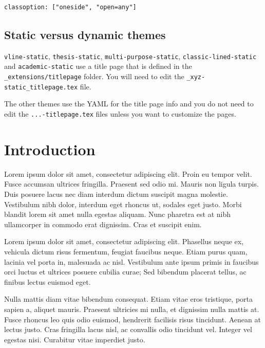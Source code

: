 \documentclass[
  oneside,
  open=any]{scrbook}
\begin{document}
\begin{verbatim}
classoption: ["oneside", "open=any"]
\end{verbatim}

\hypertarget{static-versus-dynamic-themes}{%
\section{Static versus dynamic
themes}\label{static-versus-dynamic-themes}}

\texttt{vline-static}, \texttt{thesis-static},
\texttt{multi-purpose-static}, \texttt{classic-lined-static} and
\texttt{academic-static} use a title page that is defined in the
\texttt{\_extensions/titlepage} folder. You will need to edit the
\texttt{\_xyz-static\_titlepage.tex} file.

The other themes use the YAML for the title page info and you do not
need to edit the \texttt{...-titlepage.tex} files unless you want to
customize the pages.

\hypertarget{introduction}{%
\chapter{Introduction}\label{introduction}}

Lorem ipsum dolor sit amet, consectetur adipiscing elit. Proin eu tempor
velit. Fusce accumsan ultrices fringilla. Praesent sed odio mi. Mauris
non ligula turpis. Duis posuere lacus nec diam interdum dictum suscipit
magna molestie. Vestibulum nibh dolor, interdum eget rhoncus ut, sodales
eget justo. Morbi blandit lorem sit amet nulla egestas aliquam. Nunc
pharetra est at nibh ullamcorper in commodo erat dignissim. Cras et
suscipit enim.

Lorem ipsum dolor sit amet, consectetur adipiscing elit. Phasellus neque
ex, vehicula dictum risus fermentum, feugiat faucibus neque. Etiam purus
quam, lacinia vel porta in, malesuada ac nisl. Vestibulum ante ipsum
primis in faucibus orci luctus et ultrices posuere cubilia curae; Sed
bibendum placerat tellus, ac finibus lectus euismod eget.

Nulla mattis diam vitae bibendum consequat. Etiam vitae eros tristique,
porta sapien a, aliquet mauris. Praesent ultricies mi nulla, et
dignissim nulla mattis at. Fusce rhoncus leo quis odio euismod,
hendrerit facilisis risus tincidunt. Aenean at lectus justo. Cras
fringilla lacus nisl, ac convallis odio tincidunt vel. Integer vel
egestas nisi. Curabitur vitae imperdiet justo.
\end{document}
